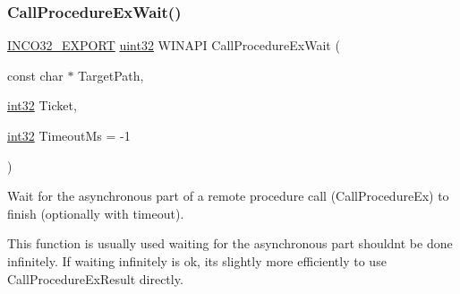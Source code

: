 \subsubsection{\texorpdfstring{Call\+Procedure\+Ex\+Wait()}{CallProcedureExWait()}}
{\footnotesize\ttfamily \hyperlink{inco__32_8h_a09505cad5bbb66fc36750a4fbca0444b}{I\+N\+C\+O32\+\_\+\+E\+X\+P\+O\+RT} \hyperlink{indeltypes_8h_a4b435a49c74bb91f284f075e63416cb6}{uint32} W\+I\+N\+A\+PI Call\+Procedure\+Ex\+Wait (\begin{DoxyParamCaption}\item[{const char $\ast$}]{Target\+Path,  }\item[{\hyperlink{indeltypes_8h_ac44d0188f4f50fd9b03031c1a06bd0a9}{int32}}]{Ticket,  }\item[{\hyperlink{indeltypes_8h_ac44d0188f4f50fd9b03031c1a06bd0a9}{int32}}]{Timeout\+Ms = {\ttfamily -\/1} }\end{DoxyParamCaption})}



Wait for the asynchronous part of a remote procedure call (Call\+Procedure\+Ex) to finish (optionally with timeout). 

This function is usually used waiting for the asynchronous part shouldn\textquotesingle{}t be done infinitely. If waiting infinitely is ok, it\textquotesingle{}s slightly more efficiently to use Call\+Procedure\+Ex\+Result directly.



